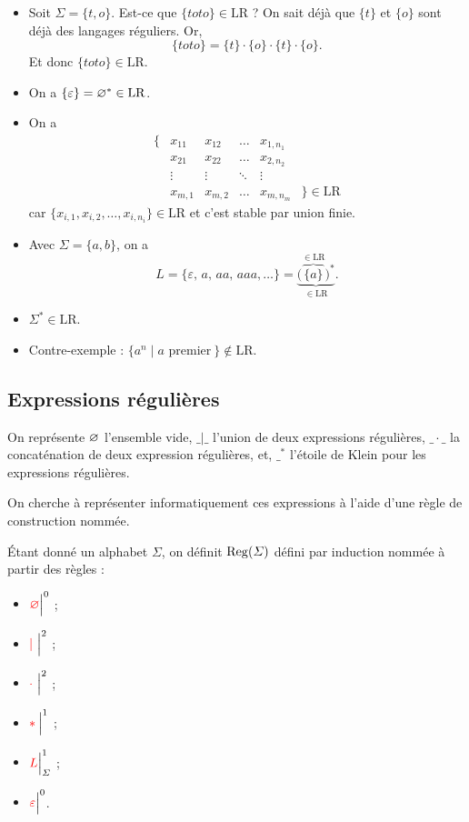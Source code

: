 \begin{exm}
	\begin{itemize}
		\item Soit $\Sigma = \{t,o\}$.
			Est-ce que $\{toto\} \in \mathrm{LR}$\/ ?
			On sait déjà que $\{t\}$\/ et $\{o\}$\/ sont déjà des langages réguliers.
			Or, \[
				\{toto\} = \{t\} \cdot \{o\} \cdot \{t\} \cdot \{o\} 
			.\] Et donc $\{toto\} \in \mathrm{LR}$.
		\item On a $\{\varepsilon\} = \varnothing^* \in \mathrm{LR}$.
		\item On a \[
				\begin{array}{rccccl}
					\{&x_{11}&x_{12}&\ldots&x_{1,n_1}\\
					&x_{21}&x_{22}&\ldots&x_{2,n_2}\\
					&\vdots&\vdots&\ddots&\vdots\\
					&x_{m,1}&x_{m,2}&\ldots&x_{m,n_m}&\} \in \mathrm{LR}
				\end{array}
			\] car $\{x_{i,1}, x_{i,2}, \ldots, x_{i,n_i}\} \in \mathrm{LR}$\/ et c'est stable par union finie.
		\item Avec $\Sigma = \{a,b\}$, on a
			\[
				L = \{\varepsilon,\,a,\,aa,\,aaa,\ldots\} = \underbrace{\Big(\overbrace{\{a\}}^{\in \mathrm{LR}}\Big)^*}_{\in \mathrm{LR}}
			.\]
		\item $\Sigma^* \in \mathrm{LR}$.
		\item Contre-exemple : $\{a^n \mid a \text{ premier}\:\} \not\in \mathrm{LR}$.
	\end{itemize}
\end{exm}

\subsection{Expressions régulières}

On représente $\varnothing$\/ l'ensemble vide, $\_|\_$\/ l'union de deux expressions régulières, $\_\cdot\_$\/ la concaténation de deux expression régulières, et, $\_^*$\/ l'étoile de {\sc Klein}\/ pour les expressions régulières.

On cherche à représenter informatiquement ces expressions à l'aide d'une règle de construction nommée.

\begin{defn}
	Étant donné un alphabet $\Sigma$, on définit $\operatorname{Reg}(\varSigma)$\/ défini par induction nommée à partir des règles :
	\begin{multicols}{2}
		\begin{itemize}
			\item ${\color{red}\varnothing}\Big|^0$\/ ;
			\item ${\color{red}|}~\Big|^2$\/ ;
			\item ${\color{red}\cdot}~\Big|^2$\/ ;
			\item ${\color{red}*}\:\Big|^1$\/ ;
			\item ${\color{red}L}\Big|^1_\varSigma$\/ ;
			\item ${\color{red}\varepsilon}\Big|^0$.
		\end{itemize}
	\end{multicols}
\end{defn}

